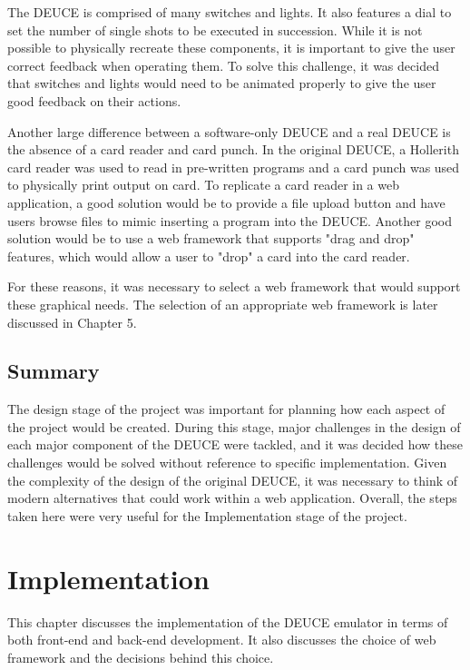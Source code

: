 \documentclass{l4proj}
\begin{document}
The DEUCE is comprised of many switches and lights. It also features a dial to set the number of single shots to be executed in succession. While it is not possible to physically recreate these components, it is important to give the user correct feedback when operating them. To solve this challenge, it was decided that switches and lights would need to be animated properly to give the user good feedback on their actions.
	
Another large difference between a software-only DEUCE and a real DEUCE is the absence of a card reader and card punch. In the original DEUCE, a Hollerith card reader was used to read in pre-written programs and a card punch was used to physically print output on card. To replicate a card reader in a web application, a good solution would be to provide a file upload button and have users browse files to mimic inserting a program into the DEUCE. Another good solution would be to use a web framework that supports "drag and drop" features, which would allow a user to "drop" a card into the card reader. 
	
For these reasons, it was necessary to select a web framework that would support these graphical needs. The selection of an appropriate web framework is later discussed in Chapter 5.

\section{Summary}
The design stage of the project was important for planning how each aspect of the project would be created. During this stage, major challenges in the design of each major component of the DEUCE were tackled, and it was decided how these challenges would be solved without reference to specific implementation. Given the complexity of the design of the original DEUCE, it was necessary to think of modern alternatives that could work within a web application. Overall, the steps taken here were very useful for the Implementation stage of the project.

\chapter{Implementation}
This chapter discusses the implementation of the DEUCE emulator in terms of both front-end and back-end development. It also discusses the choice of web framework and the decisions behind this choice. 
\end{document}
